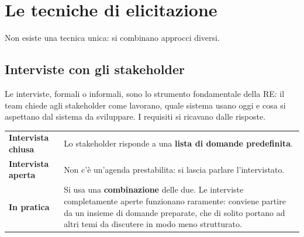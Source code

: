 \section{Le tecniche di elicitazione}

Non esiste una tecnica unica: si combinano approcci diversi.

\begin{center}
\end{center}

\subsection{Interviste con gli stakeholder}

Le interviste, formali o informali, sono lo strumento fondamentale della RE: il team chiede agli stakeholder come lavorano,
quale sistema usano oggi e cosa si aspettano dal sistema da sviluppare. I requisiti si ricavano dalle risposte.

\begin{table}[H]
\centering
\renewcommand{\arraystretch}{1.4}
\begin{tabularx}{\textwidth}{>{\bfseries}P{3.4cm} L}
\toprule
Intervista chiusa & Lo stakeholder risponde a una \textbf{lista di domande predefinita}. \\
Intervista aperta & Non c'è un'agenda prestabilita: si lascia parlare l'intervistato. \\
\midrule
\textcolor{swgreen}{\textbf{In pratica}} & Si usa una \textbf{combinazione} delle due. Le interviste completamente aperte funzionano raramente: conviene partire da un insieme di domande preparate, che di solito portano ad altri temi da discutere in modo meno strutturato. \\
\bottomrule
\end{tabularx}
\end{table}


